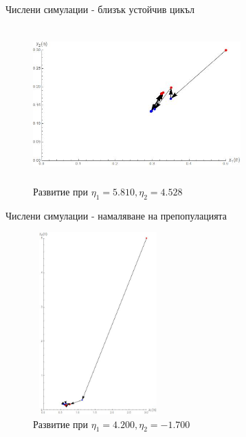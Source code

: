 
\captionsetup[figure]{labelformat=empty}

\begin{frame}[t]{Числени симулации - близък устойчив цикъл}

  \begin{center}
    \begin{figure}[htp]
      \includegraphics[width=8cm,height=6cm]{migrationSimulation1}
      \caption{Развитие при $\eta_{1}=5.810, \eta_{2}=4.528$}
    \end{figure}
  \end{center}

\end{frame}

\begin{frame}[t]{Числени симулации - намаляване на препопулацията}

  \begin{center}
    \begin{figure}[htp]
      \includegraphics[width=5cm,height=7cm]
      {migrationSimulation2}
      \caption{Развитие при $\eta_{1}=4.200, \eta_{2}=-1.700$}
    \end{figure}
  \end{center}

\end{frame}

